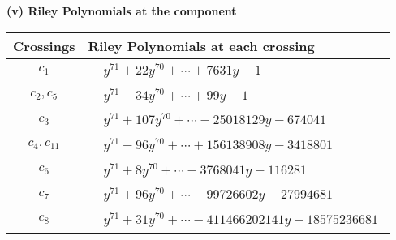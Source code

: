 \documentclass[1p]{elsarticle_modified}
\theoremstyle{definition}
\begin{document}
\newpage\renewcommand{\arraystretch}{1}
\flushleft \textbf{(v) Riley Polynomials at the component}\newline \\
\begin{tabular}{m{50pt}|m{274pt}}
Crossings & \hspace{64pt}Riley Polynomials at each crossing \\
\hline $$\begin{aligned}c_{1}\end{aligned}$$&$\begin{aligned}
&y^{71}+22 y^{70}+\cdots+7631 y-1
\end{aligned}$\\
\hline $$\begin{aligned}c_{2},c_{5}\end{aligned}$$&$\begin{aligned}
&y^{71}-34 y^{70}+\cdots+99 y-1
\end{aligned}$\\
\hline $$\begin{aligned}c_{3}\end{aligned}$$&$\begin{aligned}
&y^{71}+107 y^{70}+\cdots-25018129 y-674041
\end{aligned}$\\
\hline $$\begin{aligned}c_{4},c_{11}\end{aligned}$$&$\begin{aligned}
&y^{71}-96 y^{70}+\cdots+156138908 y-3418801
\end{aligned}$\\
\hline $$\begin{aligned}c_{6}\end{aligned}$$&$\begin{aligned}
&y^{71}+8 y^{70}+\cdots-3768041 y-116281
\end{aligned}$\\
\hline $$\begin{aligned}c_{7}\end{aligned}$$&$\begin{aligned}
&y^{71}+96 y^{70}+\cdots-99726602 y-27994681
\end{aligned}$\\
\hline $$\begin{aligned}c_{8}\end{aligned}$$&$\begin{aligned}
&y^{71}+31 y^{70}+\cdots-411466202141 y-18575236681
\end{aligned}$\\

\end{tabular}
\end{document}
